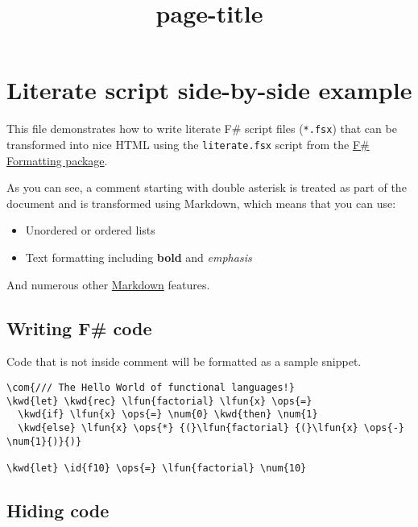\documentclass{article}
\title{{page-title}}
\date{}
\newcommand{\id}[1]{\textcolor{black}{#1}}
\newcommand{\com}[1]{\textcolor{officegreen}{#1}}
\newcommand{\kwd}[1]{\textcolor{navy}{#1}}
\newcommand{\num}[1]{\textcolor{officegreen}{#1}}
\newcommand{\ops}[1]{\textcolor{purple}{#1}}
\begin{document}
\maketitle

\section*{Literate script side-by-side example}



This file demonstrates how to write literate F\# script
files (\texttt{*.fsx}) that can be transformed into nice HTML
using the \texttt{literate.fsx} script from the \href{http://fsprojects.github.io/FSharp.Formatting}{F\# Formatting
package}.


As you can see, a comment starting with double asterisk
is treated as part of the document and is transformed
using Markdown, which means that you can use:
\begin{itemize}
\item Unordered or ordered lists

\item Text formatting including \textbf{bold} and \emph{emphasis}

\end{itemize}



And numerous other \href{http://daringfireball.net/projects/markdown}{Markdown} features.
\subsection*{Writing F\# code}



Code that is not inside comment will be formatted as
a sample snippet.
\begin{Verbatim}[commandchars=\\\{\}]
\com{/// The Hello World of functional languages!}
\kwd{let} \kwd{rec} \lfun{factorial} \lfun{x} \ops{=} 
  \kwd{if} \lfun{x} \ops{=} \num{0} \kwd{then} \num{1} 
  \kwd{else} \lfun{x} \ops{*} {(}\lfun{factorial} {(}\lfun{x} \ops{-} \num{1}{)}{)}

\kwd{let} \id{f10} \ops{=} \lfun{factorial} \num{10}
\end{Verbatim}

\subsection*{Hiding code}
\end{document}
